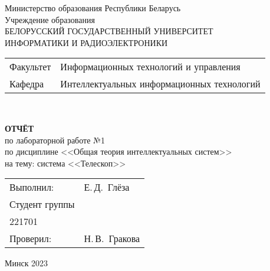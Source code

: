 \begin{titlepage}
 \begin{center}
    Министерство образования Республики Беларусь\\[1em]
    Учреждение образования\\
    БЕЛОРУССКИЙ ГОСУДАРСТВЕННЫЙ УНИВЕРСИТЕТ \\
    ИНФОРМАТИКИ И РАДИОЭЛЕКТРОНИКИ\\[1em]

    \begin{minipage}{\textwidth}
      \begin{flushleft}
        \begin{tabular}{ l l }
          Факультет & Информационных технологий и управления\\
          Кафедра   & Интеллектуальных информационных технологий
        \end{tabular}
      \end{flushleft}
    \end{minipage}\\[1em]

    \vspace{5em}


    \textbf{ОТЧЁТ}\\
    {по лабораторной работе №1}\\
    {по дисциплине <<Общая теория интеллектуальных систем>>}\\
    {на тему: система <<Телескоп>>}
    \vspace{10em}
    
    \begin{tabular}{ p{}p{} }
      Выполнил:& Е.\,Д.~Глёза \\[1em]
      Студент группы& \\
      221701 & \\
      Проверил: & Н.\,В.~Гракова \\
     
    \end{tabular}
    
    \vfill
    {\normalsize Минск 2023}
  \end{center}
\end{titlepage}